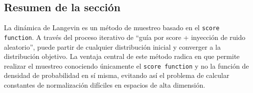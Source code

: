 \subsection{Resumen de la sección}

La dinámica de Langevin es un método de muestreo basado en el \texttt{score function}. A través del proceso iterativo de ``guía por score + inyección de ruido aleatorio'', puede partir de cualquier distribución inicial y converger a la distribución objetivo. La ventaja central de este método radica en que permite realizar el muestreo conociendo únicamente el \texttt{score function} y no la función de densidad de probabilidad en sí misma, evitando así el problema de calcular constantes de normalización difíciles en espacios de alta dimensión.


